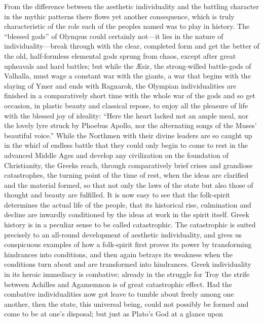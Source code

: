 \documentclass[12pt]{book}
\newcommand{\opage}[1]{\marginnote{\footnotesize\textit{[#1]}}}
\begin{document}
From the difference between the aesthetic individuality and the
battling character in the mythic patterns there flows yet another
consequence, which is truly characteristic of the role each of the
peoples named was to play in history. The ``blessed gods'' of Olympus
could certainly not---it lies in the nature of individuality---break
through with the clear, completed form and get the better of the old,
half-formless elemental gods sprung from chaos, except after great
upheavals and hard battles; but while the Æsir, the strong-willed
battle-gods of Valhalla, must wage a constant war with the giants, a war
that begins with the slaying of Ymer and ends with Ragnarok, the Olympian
individualities are finished in a comparatively short time with the
whole war of the gods and so get occasion, in plastic beauty and
classical repose, to enjoy all the pleasure of life with the blessed joy
of ideality:
``Here the heart lacked not an ample meal, nor the lovely lyre struck by
Phoebus Apollo, nor the alternating songs
\opage{24}\setcounter{footnote}{0}%
of the Muses' beautiful voice.'' While the Northmen with their divine
leaders are so caught up in the whirl of endless battle that they could
only begin to come to rest in the advanced Middle Ages and develop any
civilization on the foundation of Christianity, the Greeks reach,
through comparatively brief crises and grandiose catastrophes, the
turning point of the time of rest, when the ideas are clarified and the
material formed, so that not only the laws of the state but also those
of thought and beauty are fulfilled. It is now easy to see that the
folk-spirit determines the actual life of the people, that its
historical rise, culmination and decline are inwardly conditioned by the
ideas at work in the spirit itself. Greek history is in a peculiar sense
to be called catastrophic. The catastrophic is suited precisely to an
all-round development of aesthetic individuality, and gives us
conspicuous examples of how a folk-spirit first proves its power by
transforming hindrances into conditions, and then again betrays its
weakness when the conditions turn about and are transformed into
hindrances. Greek individuality in its heroic immediacy is combative;
already in the struggle for Troy the strife between Achilles and
Agamemnon is of great catastrophic effect. Had the combative
individualities now got leave to tumble about freely among one another,
then the state, this universal being, could not possibly be formed and
come to be at one's disposal; but just as Plato's God at a glance upon
\end{document}
